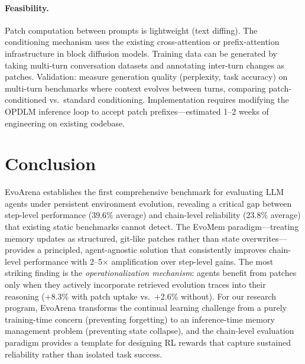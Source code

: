\documentclass[11pt,a4paper]{article}
\begin{document}
\paragraph{Feasibility.} Patch computation between prompts is lightweight (text diffing). The conditioning mechanism uses the existing cross-attention or prefix-attention infrastructure in block diffusion models. Training data can be generated by taking multi-turn conversation datasets and annotating inter-turn changes as patches. Validation: measure generation quality (perplexity, task accuracy) on multi-turn benchmarks where context evolves between turns, comparing patch-conditioned vs.\ standard conditioning. Implementation requires modifying the OPDLM inference loop to accept patch prefixes---estimated 1--2 weeks of engineering on existing codebase.

\section{Conclusion}

EvoArena establishes the first comprehensive benchmark for evaluating LLM agents under persistent environment evolution, revealing a critical gap between step-level performance (39.6\% average) and chain-level reliability (23.8\% average) that existing static benchmarks cannot detect. The EvoMem paradigm---treating memory updates as structured, git-like patches rather than state overwrites---provides a principled, agent-agnostic solution that consistently improves chain-level performance with 2--5$\times$ amplification over step-level gains. The most striking finding is the \emph{operationalization mechanism}: agents benefit from patches only when they actively incorporate retrieved evolution traces into their reasoning (+8.3\% with patch uptake vs.\ +2.6\% without). For our research program, EvoArena transforms the continual learning challenge from a purely training-time concern (preventing forgetting) to an inference-time memory management problem (preventing state collapse), and the chain-level evaluation paradigm provides a template for designing RL rewards that capture sustained reliability rather than isolated task success.
\end{document}
